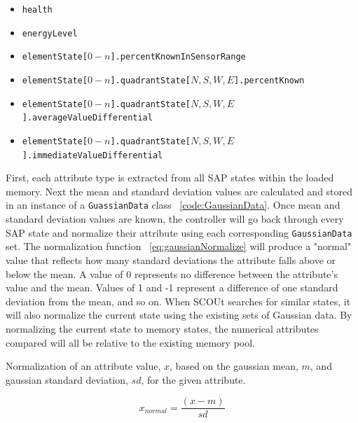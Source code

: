 \begin{itemize}
\item \texttt{health}
\item \texttt{energyLevel}
\item \texttt{elementState[$0 - n$].percentKnownInSensorRange}
\item \texttt{elementState[$0 - n$].quadrantState[$N,S,W,E$].percentKnown}
\item \texttt{elementState[$0 - n$].quadrantState[$N,S,W,E$].averageValueDifferential}
\item \texttt{elementState[$0 - n$].quadrantState[$N,S,W,E$].immediateValueDifferential}
\end{itemize}

First, each attribute type is extracted from all SAP states within the loaded memory.
Next the mean and standard deviation values are calculated and stored in an instance of a \texttt{GuassianData} class ~\ref{code:GaussianData}.
Once mean and standard deviation values are known, the controller will go back through every SAP state and normalize their attribute using each corresponding \texttt{GaussianData} set.
The normalization function ~\ref{eq:gaussianNormalize} will produce a "normal" value that reflects how many standard deviations the attribute falls above or below the mean.
A value of 0 represents no difference between the attribute's value and the mean.
Values of 1 and -1 represent a difference of one standard deviation from the mean, and so on.
When SCOUt searches for similar states, it will also normalize the current state using the existing sets of Gaussian data.
By normalizing the current state to memory states, the numerical attributes compared will all be relative to the existing memory pool.

\caption{Normalization of an attribute value, $x$, based on the gaussian mean, $m$, and gaussian standard deviation, $sd$, for the given attribute.}
\begin{equation} \label{eq:gaussianNormalize}
  x_{normal} = \frac{(x - m)}{sd}
\end{equation}



